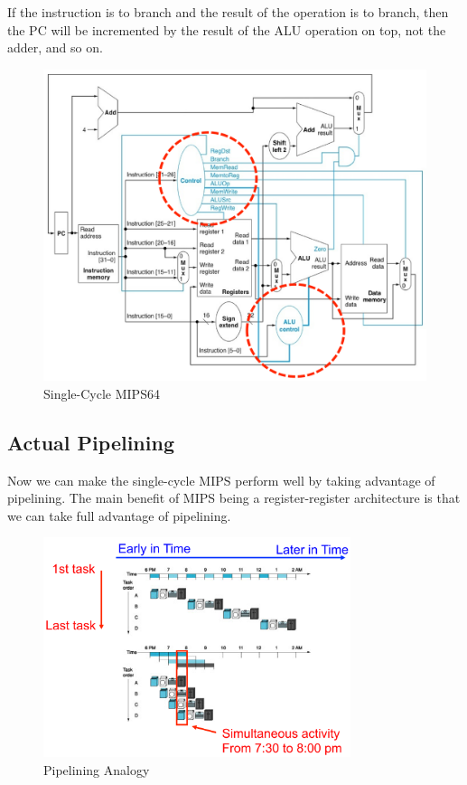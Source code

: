 \documentclass{article}
\begin{document}
If the instruction is to branch and the result of the operation is to branch, then the PC will be incremented by the result of the ALU operation on top, not the adder, and so on.

\begin{figure}[ht!]
\centering
\includegraphics[width=120mm]{img/SingleCycleMIPS.png}
\caption{Single-Cycle MIPS64}
\end{figure}

\subsection{Actual Pipelining}

Now we can make the single-cycle MIPS perform well by taking advantage of pipelining.  The main benefit of MIPS being a register-register architecture is that we can take full advantage of pipelining. 

\begin{figure}[ht!]
\centering
\includegraphics[width=90mm]{img/Pipelining.png}
\caption{Pipelining Analogy}
\end{figure}
\end{document}
